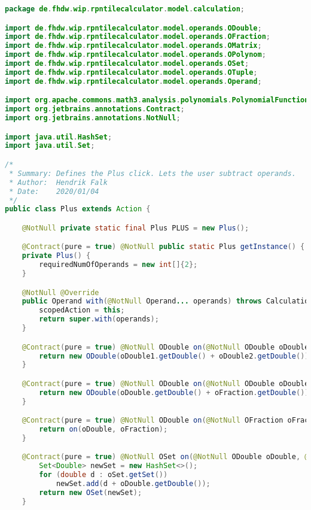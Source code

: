 \begin{lstlisting}[caption=Plus (Falk),label=list:Plus,language=Java]
package de.fhdw.wip.rpntilecalculator.model.calculation;

import de.fhdw.wip.rpntilecalculator.model.operands.ODouble;
import de.fhdw.wip.rpntilecalculator.model.operands.OFraction;
import de.fhdw.wip.rpntilecalculator.model.operands.OMatrix;
import de.fhdw.wip.rpntilecalculator.model.operands.OPolynom;
import de.fhdw.wip.rpntilecalculator.model.operands.OSet;
import de.fhdw.wip.rpntilecalculator.model.operands.OTuple;
import de.fhdw.wip.rpntilecalculator.model.operands.Operand;

import org.apache.commons.math3.analysis.polynomials.PolynomialFunction;
import org.jetbrains.annotations.Contract;
import org.jetbrains.annotations.NotNull;

import java.util.HashSet;
import java.util.Set;

/*
 * Summary: Defines the Plus click. Lets the user subtract operands.
 * Author:  Hendrik Falk
 * Date:    2020/01/04
 */
public class Plus extends Action {

    @NotNull private static final Plus PLUS = new Plus();

    @Contract(pure = true) @NotNull public static Plus getInstance() { return PLUS; }
    private Plus() {
        requiredNumOfOperands = new int[]{2};
    }

    @NotNull @Override
    public Operand with(@NotNull Operand... operands) throws CalculationException {
        scopedAction = this;
        return super.with(operands);
    }

    @Contract(pure = true) @NotNull ODouble on(@NotNull ODouble oDouble1, @NotNull ODouble oDouble2) {
        return new ODouble(oDouble1.getDouble() + oDouble2.getDouble());
    }

    @Contract(pure = true) @NotNull ODouble on(@NotNull ODouble oDouble, @NotNull OFraction oFraction) {
        return new ODouble(oDouble.getDouble() + oFraction.getDouble());
    }

    @Contract(pure = true) @NotNull ODouble on(@NotNull OFraction oFraction, @NotNull ODouble oDouble) {
        return on(oDouble, oFraction);
    }

    @Contract(pure = true) @NotNull OSet on(@NotNull ODouble oDouble, @NotNull OSet oSet) {
        Set<Double> newSet = new HashSet<>();
        for (double d : oSet.getSet())
            newSet.add(d + oDouble.getDouble());
        return new OSet(newSet);
    }


\end{lstlisting}
